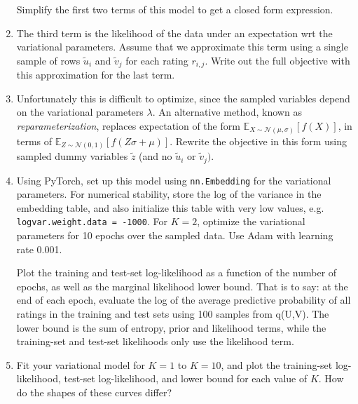 \documentclass[submit]{harvardml}
\theoremstyle{plain}
\begin{document}
\begin{problem}
\begin{enumerate}
Simplify the first two terms of this model to get a closed form expression.


\item The third term is the likelihood of the data under an expectation wrt the variational parameters.
  Assume that we approximate this term using a single sample of rows $\tilde{u}_{i}$  and $\tilde{v}_{j}$
  for each rating $r_{i,j}$. Write out the full objective with this approximation for the last term.

\item  Unfortunately this is difficult to optimize, since the sampled variables depend on the variational parameters $\lambda$. An alternative method, known as \textit{reparameterization}, replaces expectation of the form $\mathbb{E}_{X \sim \mathcal{N}(\mu, \sigma)}[f(X)]$, in terms of $\mathbb{E}_{Z \sim \mathcal{N}(0, 1)}[f(Z \sigma + \mu)]$. Rewrite the objective in this form using sampled dummy variables $\tilde{z}$ (and no
  $\tilde{u}_{i}$  or $\tilde{v}_{j})$.

\item Using PyTorch, set up this model using \texttt{nn.Embedding} for the variational parameters. For numerical stability, store the log of the variance in
  the embedding table, and also initialize this table with very low values, e.g. \texttt{logvar.weight.data = -1000}. 
  For $K = 2$, optimize the variational parameters for 10 epochs over the sampled data.  Use Adam with learning rate 0.001.

Plot the training and test-set log-likelihood as a function of the number of epochs, as well as the marginal likelihood lower bound.
That is to say: at the end of each epoch, evaluate the log of the average predictive probability of all ratings in the training and test sets using 100 samples from q(U,V).
The lower bound is the sum of entropy, prior and likelihood terms, while the training-set and test-set likelihoods only use the likelihood term.

\item Fit your variational model for $K = 1$ to $K = 10$, and plot the training-set log-likelihood, test-set log-likelihood, and lower bound for each value of $K$.
How do the shapes of these curves differ?
\end{enumerate}
\end{problem}
\end{document}
